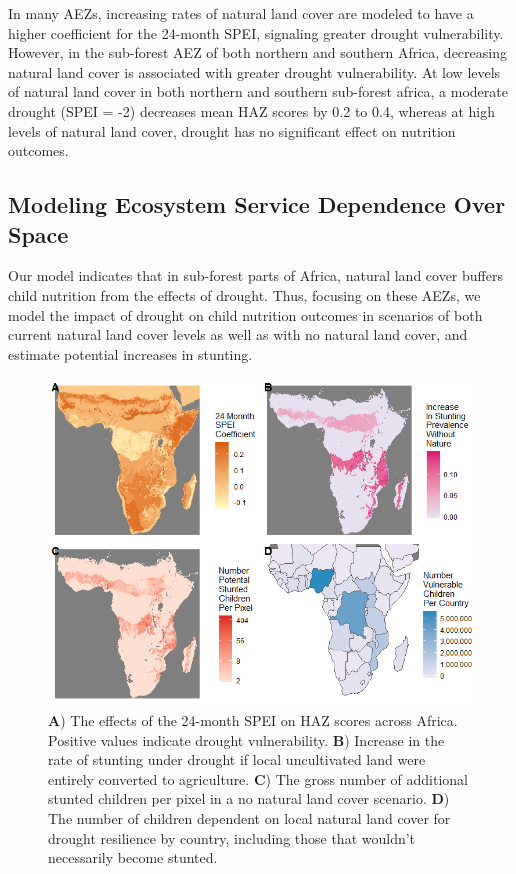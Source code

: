 \documentclass{article}
\begin{document}
In many AEZs, increasing rates of natural land cover are modeled to have a higher coefficient for the 24-month SPEI, signaling greater drought vulnerability.  However, in the sub-forest AEZ of both northern and southern Africa, decreasing natural land cover is associated with greater drought vulnerability.  At low levels of natural land cover in both northern and southern sub-forest africa, a moderate drought (SPEI = -2) decreases mean HAZ scores by 0.2 to 0.4, whereas at high levels of natural land cover, drought has no significant effect on nutrition outcomes.

\subsection{Modeling Ecosystem Service Dependence Over Space}
Our model indicates that in sub-forest parts of Africa, natural land cover buffers child nutrition from the effects of drought.  Thus, focusing on these AEZs, we model the impact of drought on child nutrition outcomes in scenarios of both current natural land cover levels as well as with no natural land cover, and estimate potential increases in stunting.

\begin{figure}
	\begin{center}
		\includegraphics[width=0.8\linewidth]{AfricaEffects.png}
		\caption{\textbf{A}) The effects of the 24-month SPEI on HAZ scores across Africa.  Positive values indicate drought vulnerability. \textbf{B}) Increase in the rate of stunting under drought if local uncultivated land were entirely converted to agriculture.  \textbf{C}) The gross number of additional stunted children per pixel in a no natural land cover scenario. \textbf{D}) The number of children dependent on local natural land cover for drought resilience by country, including those that wouldn't necessarily become stunted.}
		\label{fig:AfricaEffects.png}
	\end{center}
\end{figure}
\end{document}
